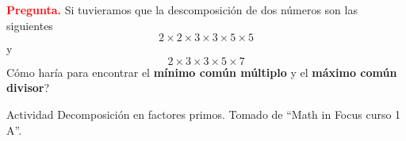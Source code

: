 \textbf{\textcolor{red}{Pregunta.}}  Si tuvieramos que la descomposición de dos números son las siguientes
\[
2\times 2\times 3\times 3\times 5\times 5
\]
y
\[
2\times  3\times 3\times 5\times 7
\]
Cómo haría para encontrar el \textbf{mínimo común múltiplo} y el \textbf{máximo común divisor}?

\newpage
Actividad Decomposición en factores primos. Tomado de “Math in Focus curso 1 A”.
\textsl{}